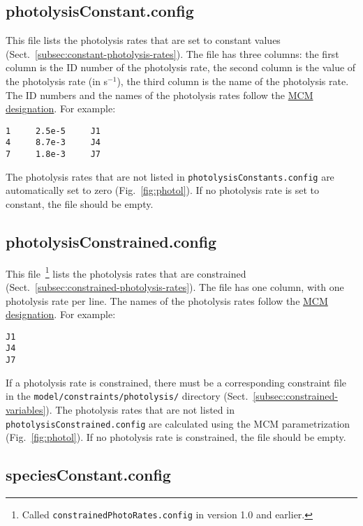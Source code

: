 \subsection{photolysisConstant.config} \label{subsec:photolysisconstant}

This file lists the photolysis rates that are set to constant values
(Sect.~\ref{subsec:constant-photolysis-rates}). The file has three
columns: the first column is the ID number of the photolysis rate, the
second column is the value of the photolysis rate (in s$^{-1}$), the
third column is the name of the photolysis rate. The ID numbers and
the names of the photolysis rates follow the
\href{https://mcm.york.ac.uk/MCM/rates/photolysis}{MCM designation}.
For example:

\begin{verbatim}
1     2.5e-5     J1
4     8.7e-3     J4
7     1.8e-3     J7
\end{verbatim}

The photolysis rates that are not listed in \texttt{photolysisConstants.config}
are automatically set to zero (Fig.~\ref{fig:photol}). If no photolysis rate
is set to constant, the file should be empty.

\subsection{photolysisConstrained.config} \label{subsec:photolysisconstrained}

This file~\footnote{Called \texttt{constrainedPhotoRates.config} in
  version 1.0 and earlier.} lists the photolysis rates that are constrained
(Sect.~\ref{subsec:constrained-photolysis-rates}). The file has one column,
with one photolysis rate per line. The names of the photolysis rates follow
the \href{https://mcm.york.ac.uk/MCM/rates/photolysis}{MCM designation}.
For example:

\begin{verbatim}
J1
J4
J7
\end{verbatim}

If a photolysis rate is constrained, there must be a corresponding
constraint file in the \texttt{model/constraints/photolysis/}
directory (Sect.~\ref{subsec:constrained-variables}). The photolysis
rates that are not listed in \texttt{photolysisConstrained.config} are
calculated using the MCM parametrization (Fig.~\ref{fig:photol}). If
no photolysis rate is constrained, the file should be empty.

\subsection{speciesConstant.config} \label{subsec:speciesconstant}

